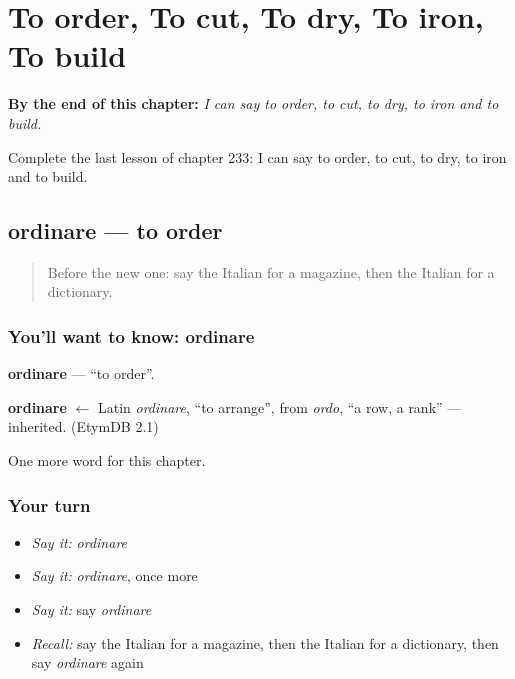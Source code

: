 
\chapter{To order, To cut, To dry, To iron, To build}
\label{ch:it-to-order-to-cut-to-dry-to-iron-to-build}

\begin{chapteropening}
\textbf{By the end of this chapter:} \emph{I can say to order, to cut, to dry, to iron and to build.}

Complete the last lesson of chapter 233: I can say to order, to cut, to dry, to iron and to build.
\end{chapteropening}

\section[ordinare]{ordinare — to order}

\label{lesson:IT-C233-ordinare}



\begin{quote}
Before the new one: say the Italian for a magazine, then the Italian for a dictionary.
\end{quote}

\subsection*{You'll want to know: ordinare}
\textbf{ordinare} — \textquotedblleft{}to order\textquotedblright{}.

\begin{cousinweb}
\textbf{ordinare} $\leftarrow$ Latin \emph{ordinare}, \textquotedblleft{}to arrange\textquotedblright{}, from \emph{ordo}, \textquotedblleft{}a row, a rank\textquotedblright{} — inherited. (EtymDB 2.1)
\end{cousinweb}

\begin{grammarlens}[title={What you've built}]
One more word for this chapter.
\end{grammarlens}

\subsection*{Your turn}
\begin{itemize}
\raggedright
  \item \emph{Say it:} \emph{ordinare}
  \item \emph{Say it:} \emph{ordinare}, once more
  \item \emph{Say it:} say \emph{ordinare}
  \item \emph{Recall:} say the Italian for a magazine, then the Italian for a dictionary, then say \emph{ordinare} again
\end{itemize}

